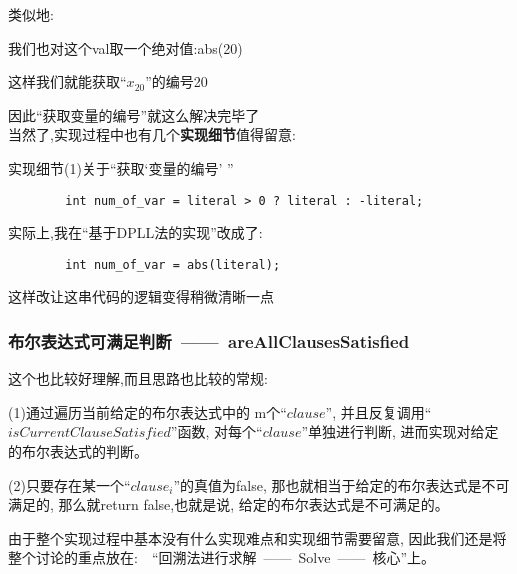         类似地:
        \begin{center}
            我们也对这个val取一个绝对值:\quad abs(20)
        \end{center}
        这样我们就能获取``$x_{20}$''的编号20\par
        因此``获取变量的编号''就这么解决完毕了\\
        \newline
        当然了,实现过程中也有几个\textbf{实现细节}值得留意:\par
        实现细节(1)关于``获取`变量的编号' ''
        \begin{lstlisting}
        int num_of_var = literal > 0 ? literal : -literal;
        \end{lstlisting}
        \noindent
        实际上,我在``基于DPLL法的实现''改成了:
        \begin{lstlisting}
        int num_of_var = abs(literal);
        \end{lstlisting}
        这样改让这串代码的逻辑变得稍微清晰一点

        \subsubsection{布尔表达式可满足判断\ ——\ areAllClausesSatisfied}
        \noindent
        这个也比较好理解,而且思路也比较的常规:\par
        (1)通过遍历当前给定的布尔表达式中的
        m个``$clause$'',
        并且反复调用``$isCurrentClauseSatisfied$''函数,
        对每个``$clause$''单独进行判断,
        进而实现对给定的布尔表达式的判断。\par
        (2)只要存在某一个``$clause_{i}$''的真值为false,
        那也就相当于给定的布尔表达式是不可满足的,
        那么就return false,也就是说,
        给定的布尔表达式是不可满足的。\par
        由于整个实现过程中基本没有什么实现难点和实现细节需要留意,
        因此我们还是将整个讨论的重点放在:$\quad$``回溯法进行求解\ ——\ Solve\ ——\ 核心''上。
        
